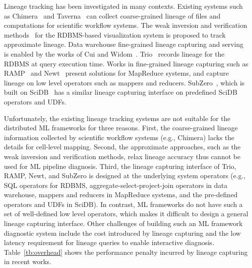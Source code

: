 \documentclass{sig-alternate}
\begin{document}
Lineage tracking has been investigated in many contexts.
Existing systems such as Chimera~\cite{foster02} and Taverna~\cite{oinn02} can collect coarse-grained lineage 
of files and computations for scientific workflow systems.
The weak inversion and verification methods~\cite{woodruff97} for the RDBMS-based visualization system 
is proposed to track approximate lineage.
Data warehouse fine-grained lineage capturing and serving is enabled by the works of Cui and Widom~\cite{cui00, cui03}.
Trio~\cite{widom04} records lineage for the RDBMS at query execution time.
Works in fine-grained lineage capturing such as RAMP~\cite{ikeda11, park11} and Newt~\cite{logothetis13} present
solutions for MapReduce systems, and capture lineage on low level operators such as mappers and reducers.
SubZero~\cite{wu13}, which is built on SciDB~\cite{brown10} has a similar lineage capturing interface on predefined SciDB operators and UDFs.

Unfortunately, the existing lineage tracking systems are not suitable for the distributed ML frameworks for three reasons.
First, the coarse-grained lineage information collected by scientific workflow systems (e.g., Chimera) lacks the details for cell-level mapping.
Second, the approximate approaches, such as the weak inversion and verification methods, 
relax lineage accuracy thus cannot be used for ML pipeline diagnosis.
Third, the lineage capturing interface of Trio, RAMP, Newt, and SubZero is designed at
the underlying system operators (e.g., SQL operators for RDBMS, aggregate-select-project-join operators in data warehouse, 
mappers and reducers in MapReduce systems, and the pre-defined operators and UDFs in SciDB). 
In contrast, ML frameworks do not have such a set of well-defined low level operators,
which makes it difficult to design a general lineage capturing interface.
Other challenges of building such an ML framework diagnostic system include the cost introduced by 
lineage capturing and the low latency requirement for lineage queries to enable interactive diagnosis.
Table~\ref{tb:overhead} shows the performance penalty incurred by lineage capturing in recent works.
\end{document}
